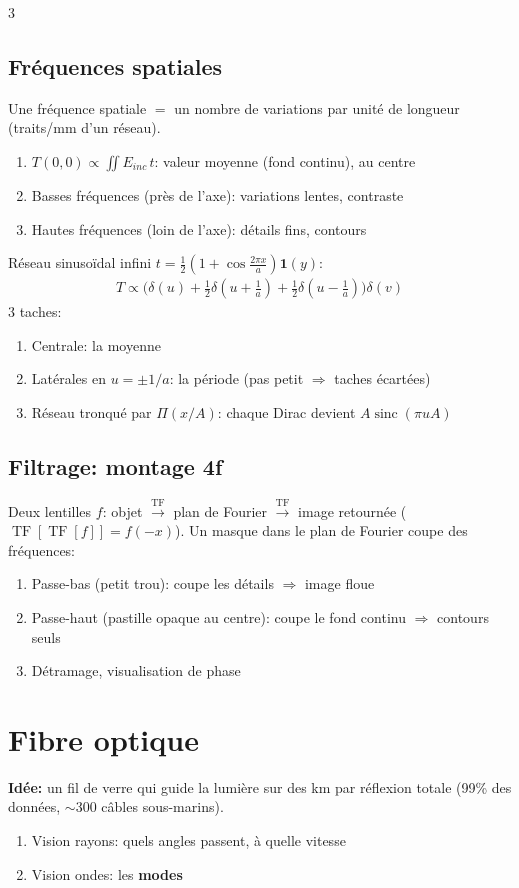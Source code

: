 \documentclass[12pt, a4paper]{article}
\newcommand{\TF}{\operatorname{TF}}
\newcommand{\sinc}{\operatorname{sinc}}
\newcommand{\porte}{\Pi}
\begin{document}
\begin{multicols*}{3}
	\subsection{Fréquences spatiales}
	Une fréquence spatiale $=$ un nombre de variations par unité de longueur (traits/mm d'un réseau).
	\begin{enumerate}[\roman*.]
		\item $T(0,0)\propto\iint E_{inc}\,t$: valeur moyenne (fond continu), au centre
		\item Basses fréquences (près de l'axe): variations lentes, contraste
		\item Hautes fréquences (loin de l'axe): détails fins, contours
	\end{enumerate}
	Réseau sinusoïdal infini $t=\frac12(1+\cos\frac{2\pi x}{a})\mathbf1(y)$:
	\begin{gather*}
		T\propto\Big(\delta(u)+\tfrac12\delta(u+\tfrac1a)+\tfrac12\delta(u-\tfrac1a)\Big)\delta(v)
	\end{gather*}
	3 taches:
	\begin{enumerate}[\roman*.]
		\item Centrale: la moyenne
		\item Latérales en $u=\pm1/a$: la période (pas petit $\Rightarrow$ taches écartées)
		\item Réseau tronqué par $\porte(x/A)$: chaque Dirac devient $A\sinc(\pi uA)$
	\end{enumerate}

	\subsection{Filtrage: montage 4f}
	Deux lentilles $f$: objet $\xrightarrow{\TF}$ plan de Fourier $\xrightarrow{\TF}$ image retournée ($\TF[\TF[f]]=f(-x)$). Un masque dans le plan de Fourier coupe des fréquences:
	\begin{enumerate}[\roman*.]
		\item Passe-bas (petit trou): coupe les détails $\Rightarrow$ image floue
		\item Passe-haut (pastille opaque au centre): coupe le fond continu $\Rightarrow$ contours seuls
		\item Détramage, visualisation de phase
	\end{enumerate}

	\colbreak
	\section{Fibre optique}
	\textbf{Idée:} un fil de verre qui guide la lumière sur des km par réflexion totale (99\% des données, $\sim$300 câbles sous-marins).
	\begin{enumerate}[\roman*.]
		\item Vision rayons: quels angles passent, à quelle vitesse
		\item Vision ondes: les \textbf{modes}
	\end{enumerate}


\end{multicols*}
\end{document}
